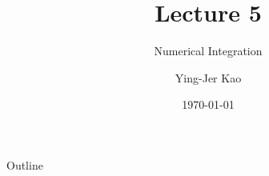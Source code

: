 \documentclass{beamer}
\title[Numerical Integration] %
{Lecture 5}
\subtitle
{Numerical Integration} %
\author[Ying-Jer Kao] %
{Ying-Jer Kao}
\institute[National Taiwan University] %
{
  Department of Physics\\
 National Taiwan University
  }
\date[Numerical Analysis and Programming] %
{\today}
\begin{document}
\begin{frame}
  \titlepage
\end{frame}

\begin{frame}{Outline}
  \tableofcontents
\end{frame}



\end{document}
